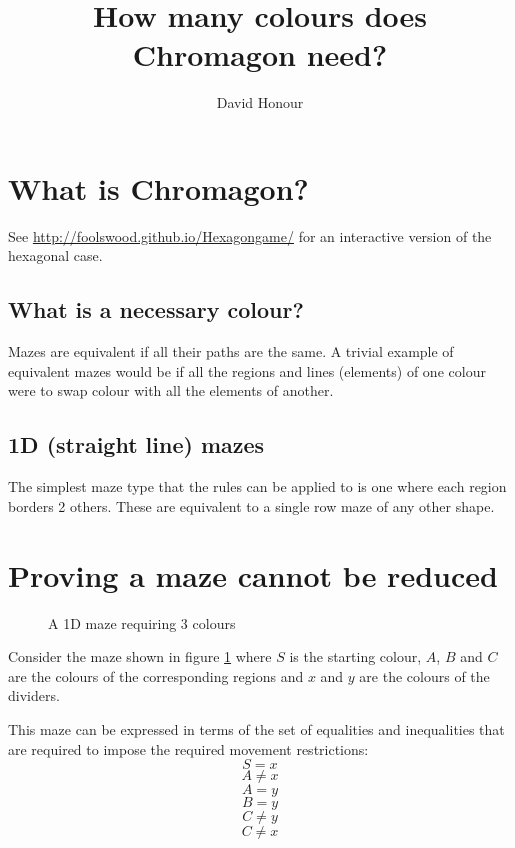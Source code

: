 \documentclass[10pt,twocolumn]{article}
\begin{document}
\title{How many colours does Chromagon need?}
\author{David Honour}
\maketitle

\section{What is Chromagon?}
See \url{http://foolswood.github.io/Hexagongame/} for an interactive version of
the hexagonal case.
\subsection{What is a necessary colour?}
Mazes are equivalent if all their paths are the same.
A trivial example of equivalent mazes would be if all the regions and lines
(elements) of one colour were to swap colour with all the elements of another.
\subsection{1D (straight line) mazes}
The simplest maze type that the rules can be applied to is one where each
region borders 2 others. These are equivalent to a single row maze of any
other shape.

\section{Proving a maze cannot be reduced}
\label{irr3}
\begin{figure}
\caption{A 1D maze requiring 3 colours}
\label{requires3}
\centering

\end{figure}
Consider the maze shown in figure \ref{requires3} where $S$ is the starting
colour, $A$, $B$ and $C$ are the colours of the corresponding regions and $x$
and $y$ are the colours of the dividers.

This maze can be expressed in terms of the set of equalities and inequalities
that are required to impose the required movement restrictions:
\begin{equation}S = x\end{equation}
\begin{equation}A \neq x \label{3neq}\end{equation}
\begin{equation}A = y\end{equation}
\begin{equation}B = y \label{3eq}\end{equation}
\begin{equation}C \neq y \label{3cny}\end{equation}
\begin{equation}C \neq x \label{3cnx}\end{equation}
\end{document}
